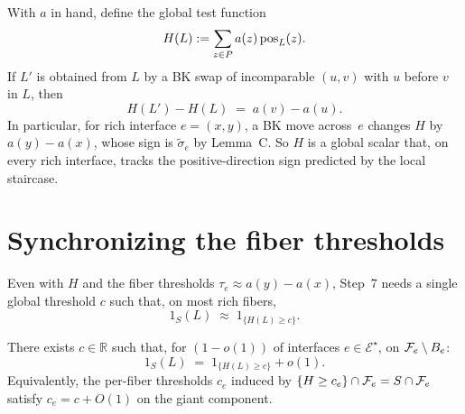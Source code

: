 With $a$ in hand, define the global test function
\[
  H(L) := \sum_{z\in P} a(z)\,\mathrm{pos}_L(z).
\]
If $L'$ is obtained from $L$ by a BK swap of incomparable $(u,v)$
with $u$ before $v$ in $L$, then
\[
  H(L') - H(L) \;=\; a(v) - a(u).
\]
In particular, for rich interface $e=(x,y)$, a BK move across~$e$
changes $H$ by $a(y)-a(x)$, whose sign is $\widetilde\sigma_e$ by
Lemma~C.
So $H$ is a global scalar that, on every rich interface, tracks the
positive-direction sign predicted by the local staircase.

\section{Synchronizing the fiber thresholds}\label{sec:global-c}

Even with $H$ and the fiber thresholds $\tau_e\approx a(y)-a(x)$,
Step~7 needs a single global threshold $c$ such that, on most rich
fibers,
\[
  1_S(L)\;\approx\;1_{\{H(L)\ge c\}}.
\]

\begin{lemma}\label{lem:single-c}
There exists $c\in\mathbb{R}$ such that, for $(1-o(1))$ of
interfaces $e\in\mathcal{E}^\star$, on $\mathcal{F}_{e}\setminus B_e$:
\[
  1_S(L)
  \;=\;
  1_{\{H(L)\ge c\}} + o(1).
\]
Equivalently, the per-fiber thresholds $c_e$ induced by
$\{H\ge c_e\}\cap\mathcal{F}_{e}=S\cap\mathcal{F}_{e}$ satisfy $c_e=c+O(1)$ on the
giant component.
\end{lemma}

